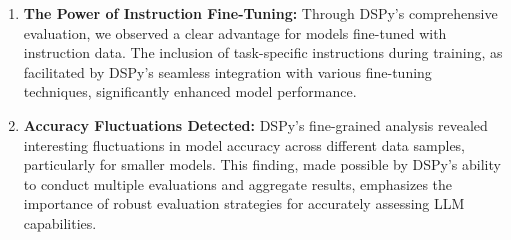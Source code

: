 \begin{enumerate}
    \item \textbf{The Power of Instruction Fine-Tuning:} Through DSPy's comprehensive evaluation, we observed a clear advantage for models fine-tuned with instruction data. The inclusion of task-specific instructions during training, as facilitated by DSPy's seamless integration with various fine-tuning techniques, significantly enhanced model performance.

    \item \textbf{Accuracy Fluctuations Detected:} DSPy's fine-grained analysis revealed interesting fluctuations in model accuracy across different data samples, particularly for smaller models. This finding, made possible by DSPy's ability to conduct multiple evaluations and aggregate results, emphasizes the importance of robust evaluation strategies for accurately assessing LLM capabilities.
\end{enumerate}